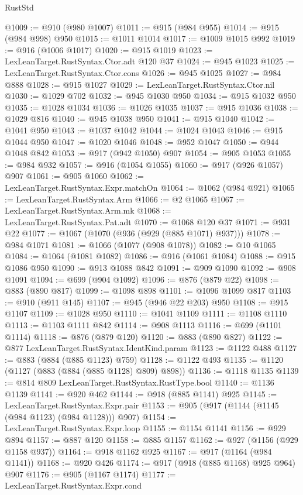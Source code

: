 \begin{lexlean}{RustStd}
\begin{coremodule}
@1009 := @910 (@980 @1007)
@1011 := @915 (@984 @955)
@1014 := @915 (@984 @998) @950
@1015 := @1011 @1014
@1017 := @1009 @1015 @992
@1019 := @916 (@1006 @1017)
@1020 := @915 @1019
@1023 := LexLeanTarget.RustSyntax.Ctor.adt @120 @37
@1024 := @945 @1023
@1025 := LexLeanTarget.RustSyntax.Ctor.cons
@1026 := @945 @1025
@1027 := @984 @888
@1028 := @915 @1027
@1029 := LexLeanTarget.RustSyntax.Ctor.nil
@1030 := @1029 @702
@1032 := @945 @1030 @950
@1034 := @915 @1032 @950
@1035 := @1028 @1034
@1036 := @1026 @1035
@1037 := @915 @1036
@1038 := @1029 @816
@1040 := @945 @1038 @950
@1041 := @915 @1040
@1042 := @1041 @950
@1043 := @1037 @1042
@1044 := @1024 @1043
@1046 := @915 @1044 @950
@1047 := @1020 @1046
@1048 := @952 @1047
@1050 := @944 @1048 @842
@1053 := @917 (@942 @1050) @907
@1054 := @905 @1053
@1055 := @984 @932
@1057 := @916 (@1054 @1055)
@1060 := @917 (@926 @1057) @907
@1061 := @905 @1060
@1062 := LexLeanTarget.RustSyntax.Expr.matchOn
@1064 := @1062 (@984 @921)
@1065 := LexLeanTarget.RustSyntax.Arm
@1066 := @2 @1065
@1067 := LexLeanTarget.RustSyntax.Arm.mk
@1068 := LexLeanTarget.RustSyntax.Pat.adt
@1070 := @1068 @120 @37
@1071 := @931 @22
@1077 := @1067 (@1070 (@936 (@929 (@885 @1071) @937)))
@1078 := @984 @1071
@1081 := @1066 (@1077 (@908 @1078))
@1082 := @10 @1065
@1084 := @1064 (@1081 @1082)
@1086 := @916 (@1061 @1084)
@1088 := @915 @1086 @950
@1090 := @913 @1088 @842
@1091 := @909 @1090
@1092 := @908 @1091
@1094 := @699 (@904 @1092)
@1096 := @876 (@879 @22)
@1098 := @883 (@890 @817)
@1099 := @1098 @898
@1101 := @1096 @1099 @817
@1103 := @910 (@911 @145)
@1107 := @945 (@946 @22 @203) @950
@1108 := @915 @1107
@1109 := @1028 @950
@1110 := @1041 @1109
@1111 := @1108 @1110
@1113 := @1103 @1111 @842
@1114 := @908 @1113
@1116 := @699 (@1101 @1114)
@1118 := @876 (@879 @120)
@1120 := @883 (@890 @827)
@1122 := @877 LexLeanTarget.RustSyntax.IdentKind.param
@1123 := @1122 @488
@1127 := @883 (@884 (@885 @1123) @759)
@1128 := @1122 @493
@1135 := @1120 (@1127 (@883 (@884 (@885 @1128) @809) @898))
@1136 := @1118 @1135
@1139 := @814 @809 LexLeanTarget.RustSyntax.RustType.bool
@1140 := @1136 @1139
@1141 := @920 @462
@1144 := @918 (@885 @1141) @925
@1145 := LexLeanTarget.RustSyntax.Expr.pair
@1153 := @905 (@917 (@1144 (@1145 (@984 @1123) (@984 @1128))) @907)
@1154 := LexLeanTarget.RustSyntax.Expr.loop
@1155 := @1154 @1141
@1156 := @929 @894
@1157 := @887 @120
@1158 := @885 @1157
@1162 := @927 (@1156 (@929 @1158 @937))
@1164 := @918 @1162 @925
@1167 := @917 (@1164 (@984 @1141))
@1168 := @920 @426
@1174 := @917 (@918 (@885 @1168) @925 @964) @907
@1176 := @905 (@1167 @1174)
@1177 := LexLeanTarget.RustSyntax.Expr.cond

\end{coremodule}
\end{lexlean}
